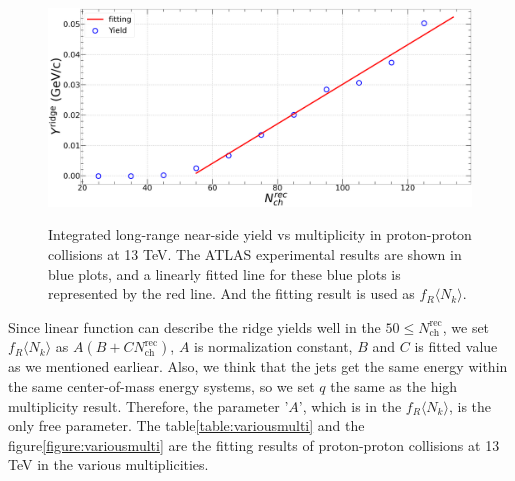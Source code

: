 \documentclass[jkps,fleqn,showpacs,showkeys]{revtex4}
\begin{document}
\begin{figure}[ht]
  \centering
  \includegraphics[width=12cm, height=6cm]{./Figures/Yield_Fitting.png}
  \caption{Integrated long-range near-side yield vs multiplicity in proton-proton collisions at 13 TeV.
  The ATLAS experimental results are shown in blue plots\cite{atlas}, and a linearly fitted line for these blue plots is represented by the red line.
  And the fitting result is used as $f_R \langle N_k \rangle$.
  }
  \label{figure:frnk_multi}
\end{figure}

Since linear function can describe the ridge yields well in the $50\leq N_{\text{ch}}^{\text{rec}}$, we set $f_R \langle N_k \rangle$ as $A(B+C N_{\text{ch}}^{\text{rec}})$, $A$ is normalization constant, $B$ and $C$ is fitted value as we mentioned earliear.
Also, we think that the jets get the same energy within the same center-of-mass energy systems, so we set $q$ the same as the high multiplicity result.
Therefore, the parameter '$A$', which is in the $f_R \langle N_k \rangle$, is the only free parameter.
The table\ref{table:variousmulti} and the figure\ref{figure:variousmulti} are the fitting results of proton-proton collisions at 13 TeV in the various multiplicities.
\end{document}
